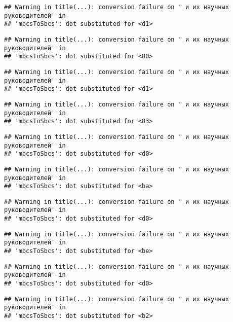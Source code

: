 \documentclass[
]{article}
\begin{document}
\begin{verbatim}
## Warning in title(...): conversion failure on ' и их научных руководителей' in
## 'mbcsToSbcs': dot substituted for <d1>
\end{verbatim}

\begin{verbatim}
## Warning in title(...): conversion failure on ' и их научных руководителей' in
## 'mbcsToSbcs': dot substituted for <80>
\end{verbatim}

\begin{verbatim}
## Warning in title(...): conversion failure on ' и их научных руководителей' in
## 'mbcsToSbcs': dot substituted for <d1>
\end{verbatim}

\begin{verbatim}
## Warning in title(...): conversion failure on ' и их научных руководителей' in
## 'mbcsToSbcs': dot substituted for <83>
\end{verbatim}

\begin{verbatim}
## Warning in title(...): conversion failure on ' и их научных руководителей' in
## 'mbcsToSbcs': dot substituted for <d0>
\end{verbatim}

\begin{verbatim}
## Warning in title(...): conversion failure on ' и их научных руководителей' in
## 'mbcsToSbcs': dot substituted for <ba>
\end{verbatim}

\begin{verbatim}
## Warning in title(...): conversion failure on ' и их научных руководителей' in
## 'mbcsToSbcs': dot substituted for <d0>
\end{verbatim}

\begin{verbatim}
## Warning in title(...): conversion failure on ' и их научных руководителей' in
## 'mbcsToSbcs': dot substituted for <be>
\end{verbatim}

\begin{verbatim}
## Warning in title(...): conversion failure on ' и их научных руководителей' in
## 'mbcsToSbcs': dot substituted for <d0>
\end{verbatim}

\begin{verbatim}
## Warning in title(...): conversion failure on ' и их научных руководителей' in
## 'mbcsToSbcs': dot substituted for <b2>
\end{verbatim}
\end{document}
